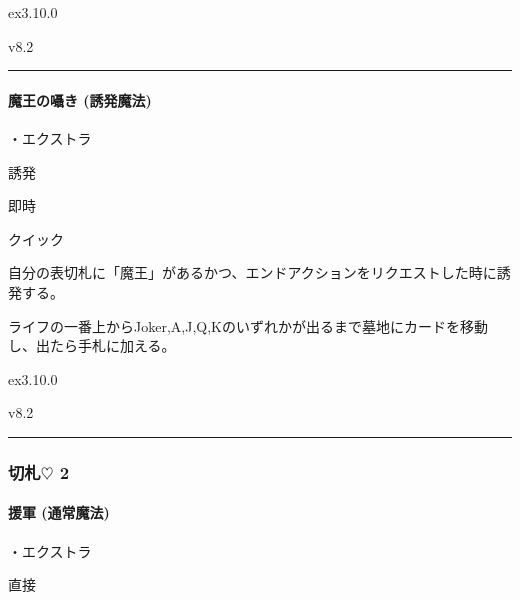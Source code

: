 \documentclass[letterpaper,10pt,dvipdfmx]{sphinxmanual}
\begin{document}
\sphinxAtStartPar
{}  ex3.10.0

\sphinxAtStartPar
{}  v8.2


\bigskip\hrule\bigskip



\paragraph{魔王の囁き (誘発魔法)}
\label{\detokenize{auto/frameActionlist:act-darkwhisper}}\label{\detokenize{auto/frameActionlist:id30}}
\sphinxAtStartPar
{}

\sphinxAtStartPar
・エクストラ

\sphinxAtStartPar
{} 誘発

\sphinxAtStartPar
{} 即時

\sphinxAtStartPar
{} クイック

\sphinxAtStartPar
{}

\sphinxAtStartPar
自分の表切札に「魔王」があるかつ、エンドアクションをリクエストした時に誘発する。

\sphinxAtStartPar
{}

\sphinxAtStartPar
ライフの一番上からJoker,A,J,Q,Kのいずれかが出るまで墓地にカードを移動し、出たら手札に加える。

\sphinxAtStartPar
{}  ex3.10.0

\sphinxAtStartPar
{}  v8.2


\bigskip\hrule\bigskip



\subsubsection{切札{\normalsize $\heartsuit$} 2}
\label{\detokenize{auto/frameActionlist:id31}}

\paragraph{援軍 (通常魔法)}
\label{\detokenize{auto/frameActionlist:act-summonreinforcement}}\label{\detokenize{auto/frameActionlist:id32}}
\sphinxAtStartPar
{}

\sphinxAtStartPar
・エクストラ

\sphinxAtStartPar
{} 直接
\end{document}

